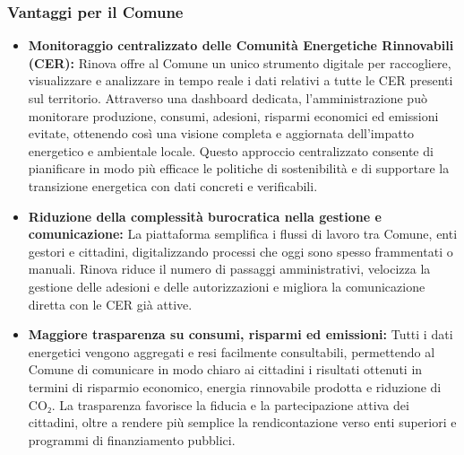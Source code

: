 \subsubsection*{Vantaggi per il Comune}
\begin{itemize}
    \item \textbf{Monitoraggio centralizzato delle Comunità Energetiche Rinnovabili (CER):}  
    Rinova offre al Comune un unico strumento digitale per raccogliere, visualizzare e analizzare in tempo reale i dati relativi a tutte le CER presenti sul territorio.  
    Attraverso una dashboard dedicata, l’amministrazione può monitorare produzione, consumi, adesioni, risparmi economici ed emissioni evitate, ottenendo così una visione completa e aggiornata dell’impatto energetico e ambientale locale.  
    Questo approccio centralizzato consente di pianificare in modo più efficace le politiche di sostenibilità e di supportare la transizione energetica con dati concreti e verificabili.
    
    \item \textbf{Riduzione della complessità burocratica nella gestione e comunicazione:}  
    La piattaforma semplifica i flussi di lavoro tra Comune, enti gestori e cittadini, digitalizzando processi che oggi sono spesso frammentati o manuali.  
    Rinova riduce il numero di passaggi amministrativi, velocizza la gestione delle adesioni e delle autorizzazioni e migliora la comunicazione diretta con le CER già attive.
    
    \item \textbf{Maggiore trasparenza su consumi, risparmi ed emissioni:}  
    Tutti i dati energetici vengono aggregati e resi facilmente consultabili, permettendo al Comune di comunicare in modo chiaro ai cittadini i risultati ottenuti in termini di risparmio economico, energia rinnovabile prodotta e riduzione di CO₂.  
    La trasparenza favorisce la fiducia e la partecipazione attiva dei cittadini, oltre a rendere più semplice la rendicontazione verso enti superiori e programmi di finanziamento pubblici.
\end{itemize}


